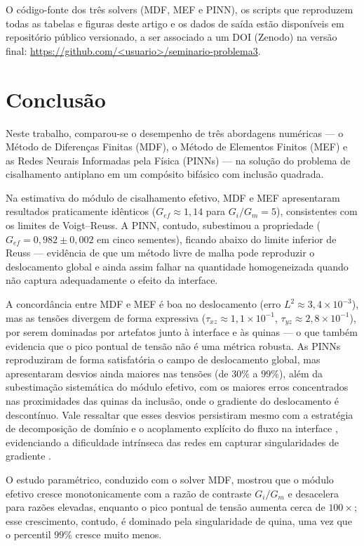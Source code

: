 \documentclass[brazil]{TCAM} %
\begin{document}
\noindent O código-fonte dos três solvers (MDF, MEF e PINN), os scripts que
reproduzem todas as tabelas e figuras deste artigo e os dados de saída estão
disponíveis em repositório público versionado, a ser associado a um DOI (Zenodo) na
versão final: \url{https://github.com/<usuario>/seminario-problema3}.

\section{Conclusão}

Neste trabalho, comparou-se o desempenho de três abordagens numéricas — o Método de Diferenças Finitas (MDF), o Método de Elementos Finitos (MEF) e as Redes Neurais Informadas pela Física (PINNs) — na solução do problema de cisalhamento antiplano em um compósito bifásico com inclusão quadrada.

Na estimativa do módulo de cisalhamento efetivo, MDF e MEF apresentaram resultados praticamente idênticos ($G_{ef} \approx 1{,}14$ para $G_i/G_m = 5$), consistentes com os limites de Voigt--Reuss. A PINN, contudo, subestimou a propriedade ($G_{ef} = 0{,}982 \pm 0{,}002$ em cinco sementes), ficando abaixo do limite inferior de Reuss --- evidência de que um método livre de malha pode reproduzir o deslocamento global e ainda assim falhar na quantidade homogeneizada quando não captura adequadamente o efeito da interface.

A concordância entre MDF e MEF é boa no deslocamento (erro $L^2 \approx 3{,}4\times10^{-3}$), mas as tensões divergem de forma expressiva ($\tau_{xz}\approx 1{,}1\times10^{-1}$, $\tau_{yz}\approx 2{,}8\times10^{-1}$), por serem dominadas por artefatos junto à interface e às quinas --- o que também evidencia que o pico pontual de tensão não é uma métrica robusta. As PINNs reproduziram de forma satisfatória o campo de deslocamento global, mas apresentaram desvios ainda maiores nas tensões (de $30\%$ a $99\%$), além da subestimação sistemática do módulo efetivo, com os maiores erros concentrados nas proximidades das quinas da inclusão, onde o gradiente do deslocamento é descontínuo. Vale ressaltar que esses desvios persistiram mesmo com a estratégia de decomposição de domínio e o acoplamento explícito do fluxo na interface \cite{jagtap2020conservative}, evidenciando a dificuldade intrínseca das redes em capturar singularidades de gradiente \cite{wang2021understanding}.

O estudo paramétrico, conduzido com o solver MDF, mostrou que o módulo efetivo cresce monotonicamente com a razão de contraste $G_i/G_m$ e desacelera para razões elevadas, enquanto o pico pontual de tensão aumenta cerca de $100\times$; esse crescimento, contudo, é dominado pela singularidade de quina, uma vez que o percentil $99\%$ cresce muito menos.
\end{document}
